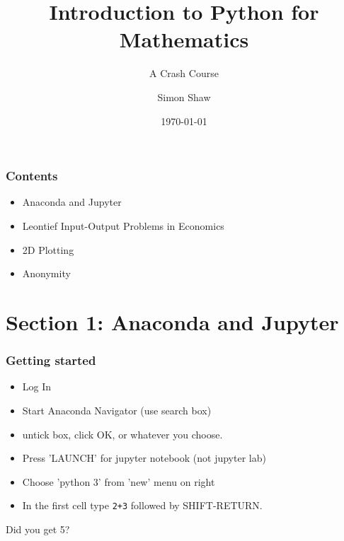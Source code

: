 \documentclass[dvips, %
               xcolor=pst,
               hyperref={colorlinks=false,
               dvips,
               citecolor=magenta,menucolor=cyan,
               bookmarks,bookmarksopen,pdfpagemode=UseThumbs}
              ]{beamer}
\title[Python for Mathematics]
      {Introduction to Python for Mathematics} %
\subtitle[beamer]{A Crash Course}
\institute[Maths]
          {Mathematics}
\author[Shaw]{Simon Shaw
}
\date{\today}
\makeatletter
\newcommand\changemode[1]{%
  \gdef\beamer@currentmode{#1}}
\makeatother
\begin{document}
\begin{frame}
\titlepage
\end{frame}

\newcommand{\BoardworkColour}{\relax}


\begin{frame}[fragile]\frametitle{Contents}

\begin{itemize}

\item Anaconda and Jupyter

\item Leontief Input-Output Problems in Economics

\item 2D Plotting

\item Anonymity

\end{itemize}

\end{frame}



\section{Section 1: Anaconda and Jupyter}

\begin{frame}[fragile]\frametitle{Getting started}

\begin{itemize}

\item Log In

\item Start Anaconda Navigator (use search box)

\item untick box, click OK, or whatever you choose.

\item Press 'LAUNCH' for jupyter notebook (not jupyter lab)

\item Choose 'python 3' from 'new' menu on right

\item In  the first cell type \verb|2+3| followed by 
SHIFT-RETURN.
\end{itemize}

Did you get 5?

\end{frame}
\end{document}
